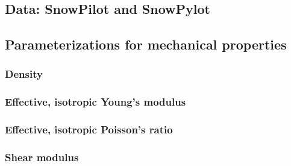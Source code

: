 \documentclass[hess, manuscript]{copernicus}
\begin{document}
\subsection{Data: SnowPilot and SnowPylot}




\subsection{Parameterizations for mechanical properties}


\subsubsection{Density}


\subsubsection{Effective, isotropic Young's modulus}


\subsubsection{Effective, isotropic Poisson's ratio}


\subsubsection{Shear modulus}

\end{document}
